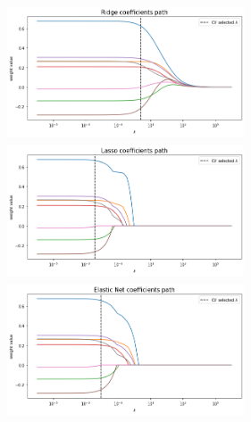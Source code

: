 \begin{frame}
\centering
\includegraphics[width=7cm,height=4cm, left]{Img/data_ridge_coef_path.png}
\includegraphics[width=7cm,height=4cm, right]{Img/data_lasso_coef_path.png}\\
\centering
\includegraphics[width=7cm,height=4cm, center]{Img/data_elnet_coef_path.png}\\
\end{frame}

